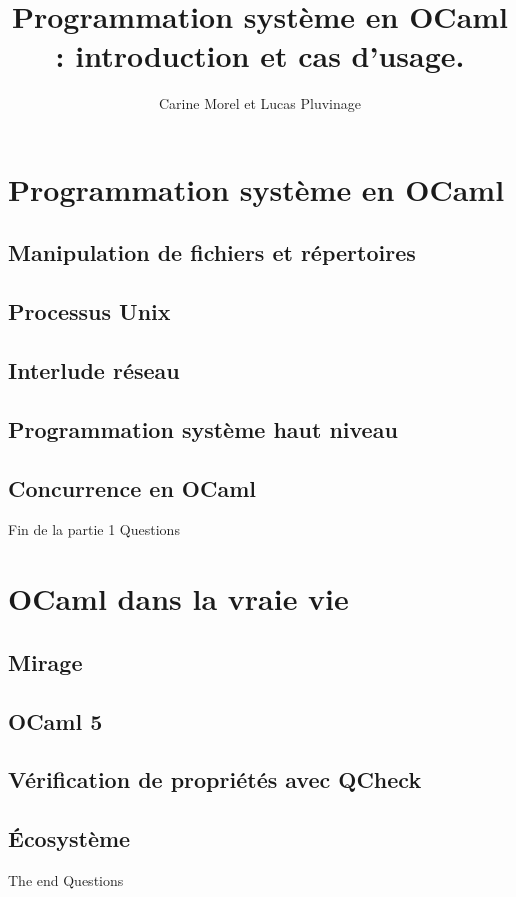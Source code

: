 \documentclass[xcolor=x11names]{beamer}
\title[Programmation système en OCaml]{Programmation système en OCaml : introduction et cas d'usage.}
\author[Carine et Lucas]{Carine Morel et Lucas Pluvinage}
\institute{Tarides}
\begin{document}
\maketitle


\section{Programmation système en OCaml}


\subsection{Manipulation de fichiers et répertoires}




\subsection{Processus Unix }



\subsection{Interlude réseau}


\subsection{Programmation système haut niveau}


\subsection{Concurrence en OCaml}


\begin{frame}{Fin de la partie 1}
\Large
\centering
Questions
\end{frame}

\section{OCaml dans la vraie vie}

\subsection{Mirage}

\subsection{OCaml 5}

\subsection{Vérification de propriétés avec QCheck}

\subsection{Écosystème}


\begin{frame}{The end}
\Large
\centering
Questions
\end{frame}
\end{document}
